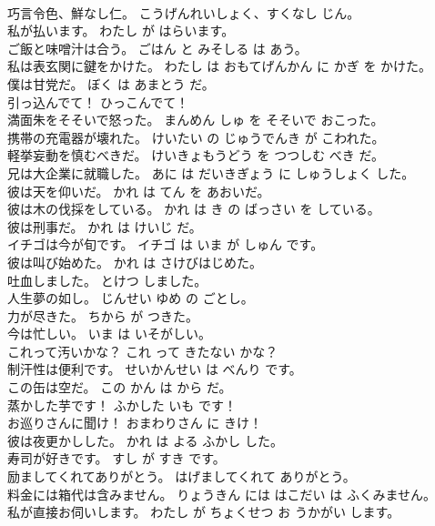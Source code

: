 \documentclass[8pt]{extreport}
\begin{document}
\begin{CJK}{UTF8}{min}
\\	巧言令色、鮮なし仁。	こうげんれいしょく、すくなし じん。	
\\	私が払います。	わたし が はらいます。	
\\	ご飯と味噌汁は合う。	ごはん と みそしる は あう。	
\\	私は表玄関に鍵をかけた。	わたし は おもてげんかん に かぎ を かけた。	
\\	僕は甘党だ。	ぼく は あまとう だ。	
\\	引っ込んでて！	ひっこんでて！	
\\	満面朱をそそいで怒った。	まんめん しゅ を そそいで おこった。	
\\	携帯の充電器が壊れた。	けいたい の じゅうでんき が こわれた。	
\\	軽挙妄動を慎むべきだ。	けいきょもうどう を つつしむ べき だ。	
\\	兄は大企業に就職した。	あに は だいきぎょう に しゅうしょく した。	
\\	彼は天を仰いだ。	かれ は てん を あおいだ。	
\\	彼は木の伐採をしている。	かれ は き の ばっさい を している。	
\\	彼は刑事だ。	かれ は けいじ だ。	
\\	イチゴは今が旬です。	イチゴ は いま が しゅん です。	
\\	彼は叫び始めた。	かれ は さけびはじめた。	
\\	吐血しました。	とけつ しました。	
\\	人生夢の如し。	じんせい ゆめ の ごとし。	
\\	力が尽きた。	ちから が つきた。	
\\	今は忙しい。	いま は いそがしい。	
\\	これって汚いかな？	これ って きたない かな？	
\\	制汗性は便利です。	せいかんせい は べんり です。	
\\	この缶は空だ。	この かん は から だ。	
\\	蒸かした芋です！	ふかした いも です！	
\\	お巡りさんに聞け！	おまわりさん に きけ！	
\\	彼は夜更かしした。	かれ は よる ふかし した。	
\\	寿司が好きです。	すし が すき です。	
\\	励ましてくれてありがとう。	はげましてくれて ありがとう。	
\\	料金には箱代は含みません。	りょうきん には はこだい は ふくみません。	
\\	私が直接お伺いします。	わたし が ちょくせつ お うかがい します。	

\end{CJK}
\end{document}
